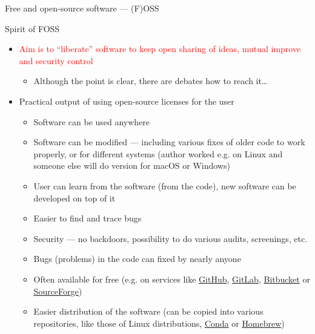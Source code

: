 \documentclass[compress, xelatex, 11pt, xcolor=svgnames, aspectratio=169, url={hyphens, lowtilde}]{beamer}
\renewcommand{\alert}[1]{\textcolor{red}{#1}}
\begin{document}
\begin{frame}[allowframebreaks]{Free and open-source software --- (F)OSS}
\begin{block}{Spirit of FOSS}
\begin{itemize}
			\item \alert{Aim is to \enquote{liberate} software to keep open sharing of ideas, mutual improve and security control}
			\begin{itemize}
				\item Although the point is clear, there are debates how to reach it\ldots
			\end{itemize}
		\end{itemize}
	\end{block}
	\begin{itemize}
		\item Practical output of using open-source licenses for the user
		\begin{itemize}
			\item Software can be used anywhere
			\item Software can be modified --- including various fixes of older code to work properly, or for different systems (author worked e.g. on Linux and someone else will do version for macOS or Windows)
			\item User can learn from the software (from the code), new software can be developed on top of it
			\item Easier to find and trace bugs
			\item Security --- no backdoors, possibility to do various audits, screenings, etc.
			\item Bugs (problems) in the code can fixed by nearly anyone
			\item Often available for free (e.g. on services like \href{https://github.com/}{GitHub}, \href{https://gitlab.com/}{GitLab}, \href{https://bitbucket.org/}{Bitbucket} or \href{https://sourceforge.net/}{SourceForge})
			\item Easier distribution of the software (can be copied into various repositories, like those of Linux distributions, \href{https://docs.conda.io/}{Conda} or \href{https://brew.sh/}{Homebrew})
		\end{itemize}
	\end{itemize}
\end{frame}
\end{document}
